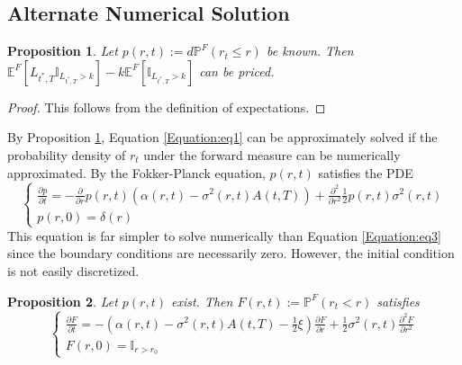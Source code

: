 \documentclass[12pt]{article}
\newtheorem{bond}{Proposition}
\theoremstyle{definition}
\theoremstyle{remark}
\begin{document}
\subsection{Alternate Numerical Solution}
\begin{bond}
Let \(p(r, t) := d\mathbb{P}^F (r_t \leq r)\) be known. Then \(\mathbb{E}^{F} \left[L_{{t^*}, T} \mathbb{I}_{ L_{{t^*}, T}>k} \right] -k\mathbb{E}^{F} \left[\mathbb{I}_{L_{{t^*}, T} >k}\right]\) can be priced.
 \label{Proposition:prop4}
\end{bond}
\begin{proof}
This follows from the definition of expectations.
\end{proof}
By Proposition \ref{Proposition:prop4}, Equation \ref{Equation:eq1} can be approximately solved if the probability density of \(r_t\) under the forward measure can be numerically approximated.
By the Fokker-Planck equation, \(p(r, t) \) satisfies the PDE
\begin{equation} \left \{\begin{array}{rl} \frac{\partial p}{\partial t} =-\frac{\partial}{\partial r} p(r, t) \left(\alpha(r, t)-\sigma^2(r, t)A(t, T)\right)+\frac{\partial ^2}{\partial r^2} \frac{1}{2}p(r, t)\sigma^2 (r, t) \\
p(r, 0)=\delta(r)
\end{array}
\right.
\end{equation}
This equation is far simpler to solve numerically than Equation \ref{Equation:eq3} since the boundary conditions are necessarily zero.  However, the initial condition is not easily discretized.
\begin{bond}
Let \(p(r, t)\) exist.  Then
\(F(r, t):= \mathbb{P} ^F (r_t <r) \) satisfies 
\begin{equation} \left \{ \begin{array}{rl} 
\frac{\partial F}{\partial t}=-\left(\alpha(r, t)-\sigma^2(r, t)A(t, T)-\frac{1}{2} \xi \right) \frac{\partial F}{\partial r} +\frac{1}{2} \sigma^2 (r, t) \frac{\partial^2 F}{\partial r^2} \\
F(r, 0)=\mathbb{I}_{r>r_0}
\end{array} 
\right.
\label{Equation:eq7}
\end{equation}
\label{Proposition:prop6}
\end{bond}
\end{document}
